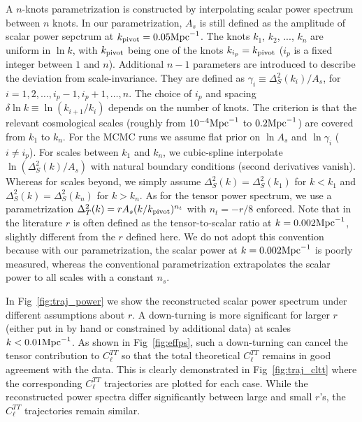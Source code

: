 \documentclass[11pt]{article}
\begin{document}
A $n$-knots parametrization is constructed by interpolating scalar power spectrum between $n$ knots. In our parametrization,  $A_s$ is still defined as the amplitude of scalar power sepctrum at $k_{\rm pivot}=0.05 {\rm Mpc}^{-1}$. The knots $k_1$, $k_2$, ..., $k_n$ are uniform in $\ln k$, with $k_{\rm pivot}$ being one of the knots $k_{i_p} = k_{\rm pivot}$ ($i_p$ is a fixed integer between $1$ and $n$). Additional $n-1$ parameters are introduced to describe the deviation from scale-invariance. They are defined as $\gamma_i\equiv \Delta^2_S(k_i)/ A_s$, for $i = 1, 2, \ldots, i_p - 1, i_p+1, \ldots, n$.  The choice of $i_p$ and spacing $\delta\ln k \equiv \ln (k_{i+1}/k_i)$ depends on the number of knots. The criterion is that the relevant cosmological scales (roughly from $10^{-4}{\rm Mpc}^{-1}$ to $0.2 {\rm Mpc}^{-1}$) are covered from $k_1$ to $k_n$. For the MCMC runs we assume flat prior on $\ln A_s$ and $\ln \gamma_i$ ($i\neq i_p$). For scales between $k_1$ and $k_n$, we cubic-spline interpolate $\ln (\Delta^2_S(k)/A_s)$ with natural boundary conditions (second derivatives vanish). Whereas for scales beyond, we simply assume $\Delta^2_S(k) = \Delta^2_S(k_1)$ for $k<k_1$ and $\Delta^2_S(k) = \Delta^2_S(k_n)$ for $k>k_n$. As for the tensor power spectrum, we use a parametrization $\Delta^2_T(k) = r A_s (k/k_{\rm pivot})^{n_t}$ with $n_t = -r/8$ enforced. Note that in the literature $r$ is often defined as the tensor-to-scalar ratio at $k=0.002 {\rm Mpc}^{-1}$, slightly different from the $r$ defined here. We do not adopt this convention because with our parametrization, the scalar power at $k=0.002 {\rm Mpc}^{-1}$ is poorly measured, whereas the conventional parametrization extrapolates the scalar power to all scales with a constant $n_s$.

In Fig~\ref{fig:traj_power} we show the reconstructed scalar power spectrum under different assumptions about $r$. A down-turning is more significant for larger $r$ (either put in by hand or constrained by additional data) at scales $k<0.01 {\rm Mpc}^{-1}$. As shown in Fig~\ref{fig:effps}, such a down-turning can cancel the tensor contribution to $C_\ell^{TT}$ so that the total theoretical $C_\ell^{TT}$ remains in good agreement with the data. This is clearly demonstrated in Fig~\ref{fig:traj_cltt} where the corresponding $C_\ell^{TT}$ trajectories are plotted for each case. While the reconstructed power spectra differ significantly between large and small $r$'s, the $C_\ell^{TT}$ trajectories remain similar.
\end{document}
